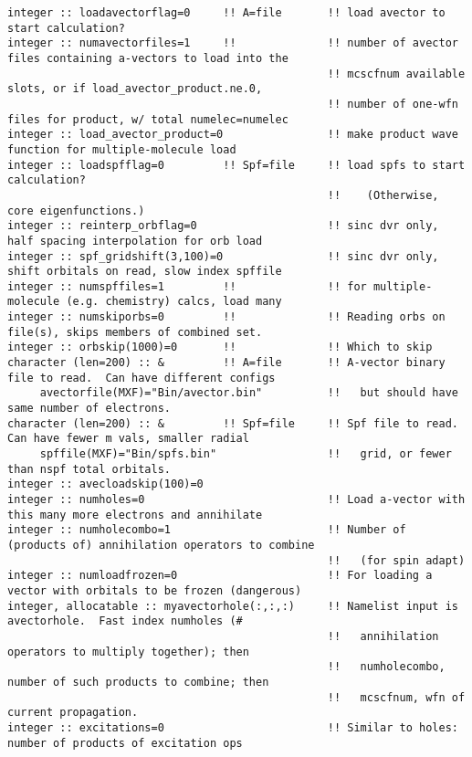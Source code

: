 \begin{verbatim}
integer :: loadavectorflag=0     !! A=file       !! load avector to start calculation?
integer :: numavectorfiles=1     !!              !! number of avector files containing a-vectors to load into the
                                                 !! mcscfnum available slots, or if load_avector_product.ne.0,
                                                 !! number of one-wfn files for product, w/ total numelec=numelec
integer :: load_avector_product=0                !! make product wave function for multiple-molecule load
integer :: loadspfflag=0         !! Spf=file     !! load spfs to start calculation?  
                                                 !!    (Otherwise, core eigenfunctions.)
integer :: reinterp_orbflag=0                    !! sinc dvr only, half spacing interpolation for orb load
integer :: spf_gridshift(3,100)=0                !! sinc dvr only, shift orbitals on read, slow index spffile
integer :: numspffiles=1         !!              !! for multiple-molecule (e.g. chemistry) calcs, load many
integer :: numskiporbs=0         !!              !! Reading orbs on file(s), skips members of combined set.
integer :: orbskip(1000)=0       !!              !! Which to skip
character (len=200) :: &         !! A=file       !! A-vector binary file to read.  Can have different configs
     avectorfile(MXF)="Bin/avector.bin"          !!   but should have same number of electrons.   
character (len=200) :: &         !! Spf=file     !! Spf file to read.  Can have fewer m vals, smaller radial 
     spffile(MXF)="Bin/spfs.bin"                 !!   grid, or fewer than nspf total orbitals. 
integer :: avecloadskip(100)=0
integer :: numholes=0                            !! Load a-vector with this many more electrons and annihilate
integer :: numholecombo=1                        !! Number of (products of) annihilation operators to combine 
                                                 !!   (for spin adapt)
integer :: numloadfrozen=0                       !! For loading a vector with orbitals to be frozen (dangerous)
integer, allocatable :: myavectorhole(:,:,:)     !! Namelist input is avectorhole.  Fast index numholes (#
                                                 !!   annihilation operators to multiply together); then    
                                                 !!   numholecombo, number of such products to combine; then
                                                 !!   mcscfnum, wfn of current propagation.
integer :: excitations=0                         !! Similar to holes: number of products of excitation ops

\end{verbatim}

